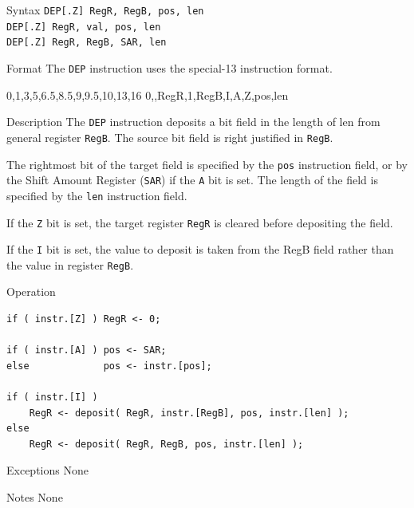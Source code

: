 %
%
\pagebreak
{}

\begin{iPageDescEntry}{Syntax}
\texttt{DEP[.Z] RegR, RegB, pos, len} \\
\texttt{DEP[.Z] RegR, val, pos, len} \\
\texttt{DEP[.Z] RegR, RegB, SAR, len}
\end{iPageDescEntry}

\begin{iPageDescEntry}{Format}
The \texttt{DEP} instruction uses the special-13 instruction format. \\

\begin{flushleft}
\drawInstrFormat
    {0,1,3,5,6.5,8.5,9,9.5,10,13,16}
    {0,\OpCodeDEP,RegR,1,RegB,I,A,Z,pos,len}
\end{flushleft}
\end{iPageDescEntry}

\begin{iPageDescEntry}{Description}
The \texttt{DEP} instruction deposits a bit field in the length of len from general register \texttt{RegB}. The source bit field is right justified in \texttt{RegB}.

The rightmost bit of the target field is specified by the \texttt{pos} instruction field, or by the Shift Amount Register (\texttt{SAR}) if the \texttt{A} bit is set. The length of the field is specified by the \texttt{len} instruction field.  

If the \texttt{Z} bit is set, the target register \texttt{RegR} is cleared before depositing the field. 

If the \texttt{I} bit is set, the value to deposit is taken from the RegB field rather than the value in register \texttt{RegB}.
\end{iPageDescEntry}

\begin{iPageDescOpEntry}{Operation}
\begin{lstlisting}[style=iPageOpStyle]
if ( instr.[Z] ) RegR <- 0;

if ( instr.[A] ) pos <- SAR; 
else             pos <- instr.[pos];

if ( instr.[I] ) 
    RegR <- deposit( RegR, instr.[RegB], pos, instr.[len] ); 
else 
    RegR <- deposit( RegR, RegB, pos, instr.[len] );
\end{lstlisting}
\end{iPageDescOpEntry}

\begin{iPageDescEntry}{Exceptions}
None
\end{iPageDescEntry}

\begin{iPageDescEntry}{Notes}
None
\end{iPageDescEntry}
